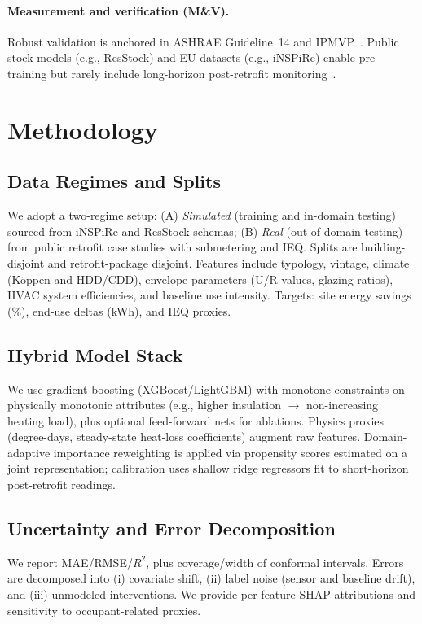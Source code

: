 \documentclass{article}
\begin{document}
\paragraph{Measurement and verification (M\&V).} Robust validation is anchored in ASHRAE Guideline~14 and IPMVP~\citep{ashrae2014guideline,ipmvp2012}. Public stock models (e.g., ResStock) and EU datasets (e.g., iNSPiRe) enable pre-training but rarely include long-horizon post-retrofit monitoring~\citep{resstock2017,wolf2014inspire}.

\section{Methodology}
\subsection{Data Regimes and Splits}
We adopt a two-regime setup: (A) \emph{Simulated} (training and in-domain testing) sourced from iNSPiRe and ResStock schemas; (B) \emph{Real} (out-of-domain testing) from public retrofit case studies with submetering and IEQ. Splits are building-disjoint and retrofit-package disjoint. Features include typology, vintage, climate (K\"oppen and HDD/CDD), envelope parameters (U/R-values, glazing ratios), HVAC system efficiencies, and baseline use intensity. Targets: site energy savings (\%), end-use deltas (kWh), and IEQ proxies.
\subsection{Hybrid Model Stack}
We use gradient boosting (XGBoost/LightGBM) with monotone constraints on physically monotonic attributes (e.g., higher insulation $\rightarrow$ non-increasing heating load), plus optional feed-forward nets for ablations. Physics proxies (degree-days, steady-state heat-loss coefficients) augment raw features. Domain-adaptive importance reweighting is applied via propensity scores estimated on a joint representation; calibration uses shallow ridge regressors fit to short-horizon post-retrofit readings.
\subsection{Uncertainty and Error Decomposition}
We report MAE/RMSE/$R^2$, plus coverage/width of conformal intervals. Errors are decomposed into (i) covariate shift, (ii) label noise (sensor and baseline drift), and (iii) unmodeled interventions. We provide per-feature SHAP attributions and sensitivity to occupant-related proxies.
\end{document}
